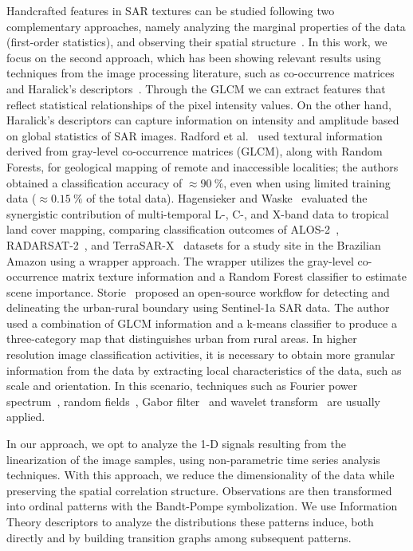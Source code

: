 \documentclass[journal]{IEEEtran}
\begin{document}
	Handcrafted features in SAR textures can be studied following two complementary approaches, namely analyzing the marginal properties of the data (first-order statistics), and observing their spatial structure~\cite{Yue2020Gaussian, numbisi2018multi}.
	In this work, we focus on the second approach, which has been showing relevant results using techniques from the image processing literature, such as co-occurrence matrices and Haralick's descriptors~\cite{yu2019detection}.
	Through the GLCM we can extract features that reflect statistical relationships of the pixel intensity values.
	On the other hand, Haralick's descriptors can capture information on intensity and amplitude based on global statistics of SAR images.
	Radford et al.~\cite{radford2018geological} used textural information derived from gray-level co-occurrence matrices (GLCM), along with Random Forests, for geological mapping of remote and inaccessible localities; the authors obtained a classification accuracy of $\approx\SI{90}{\percent}$, even when using limited training data ($\approx\SI{0.15}{\percent}$ of the total data). 	
	Hagensieker and Waske~\cite{hagensieker2018evaluation} evaluated the synergistic contribution of multi-temporal L-, C-, and X-band data to tropical land cover mapping, comparing classification outcomes of ALOS-2~\cite{kankaku2013alos}, RADARSAT-2~\cite{morena2004introduction}, and TerraSAR-X~\cite{breit2009terrasar} datasets for a study site in the Brazilian Amazon using a wrapper approach. 
	The wrapper utilizes the gray-level co-occurrence matrix texture information and a  Random Forest classifier to estimate scene importance. 	
	Storie~\cite{storie2018urban} proposed an open-source workflow for detecting and delineating the urban-rural boundary using Sentinel-1a SAR data.
	The author used a combination of GLCM information and a k-means classifier to produce a three-category map that distinguishes urban from rural areas. 
	In higher resolution image classification activities, it is necessary to obtain more granular information from the data by extracting local characteristics of the data, such as scale and orientation.
	In this scenario, techniques such as Fourier power spectrum~\cite{Florindo2012Fractal}, random fields~\cite{zhu2016antarctic}, Gabor filter~\cite{dumitru2014information} and wavelet transform~\cite{akbarizadeh2012new} are usually applied.
	
	In our approach, we opt to analyze the \mbox{1-D} signals resulting from the linearization of the image samples, using non-parametric time series analysis techniques.
	With this approach, we reduce the dimensionality of the data while preserving the spatial correlation structure.
	Observations are then transformed into ordinal patterns with the Bandt-Pompe symbolization.
	We use Information Theory descriptors to analyze the distributions these patterns induce, both directly and by building transition graphs among subsequent patterns.
	
\end{document}
